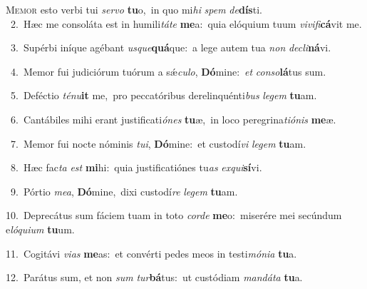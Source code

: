 \lettrine{\initial\textcolor{\initialcolor}{M}}{emor} esto verbi tui \textit{ser}\-\textit{vo} \textbf{tu}\-o,~\star in quo mi\textit{hi} \textit{spem} \textit{de}\-\textbf{dís}ti.\\
{\numbfont\textcolor{\numbcolor}{~2.}}~Hæc me consoláta est in humili\-\textit{tá}\-\textit{te} \textbf{me}\-a:~\star quia elóquium tuum \textit{vi}\-\textit{vi}\textit{fi}\textbf{cá}vit me.\par
{\numbfont\textcolor{\numbcolor}{~3.}}~Supérbi iníque agébant \textit{us}\-\textit{que}\textbf{quá}que:~\star a lege autem tua \textit{non} \textit{de}\-\textit{cli}\textbf{ná}vi.\par
{\numbfont\textcolor{\numbcolor}{~4.}}~Memor fui judiciórum tuórum a sǽ\-\textit{cu}\-\textit{lo}, \textbf{Dó}\-mine:~\star \textit{et} \textit{con}\-\textit{so}\textbf{lá}tus sum.\par
{\numbfont\textcolor{\numbcolor}{~5.}}~Deféctio \textit{té}\-\textit{nu}\textbf{it} me,~\star pro peccatóribus derelinquénti\textit{bus} \textit{le}\-\textit{gem} \textbf{tu}\-am.\par
{\numbfont\textcolor{\numbcolor}{~6.}}~Cantábiles mihi erant justificati\-\textit{ó}\-\textit{nes} \textbf{tu}\-æ,~\star in loco peregrina\-\textit{ti}\-\textit{ó}\textit{nis} \textbf{me}\-æ.\par
{\numbfont\textcolor{\numbcolor}{~7.}}~Memor fui nocte nóminis \textit{tu}\-\textit{i}, \textbf{Dó}\-mine:~\star et custodí\textit{vi} \textit{le}\-\textit{gem} \textbf{tu}\-am.\par
{\numbfont\textcolor{\numbcolor}{~8.}}~Hæc fac\textit{ta} \textit{est} \textbf{mi}\-hi:~\star quia justificatiónes tu\textit{as} \textit{ex}\-\textit{qui}\textbf{sí}vi.\par
{\numbfont\textcolor{\numbcolor}{~9.}}~Pórtio \textit{me}\-\textit{a}, \textbf{Dó}\-mine,~\star dixi custodí\textit{re} \textit{le}\-\textit{gem} \textbf{tu}\-am.\par
{\numbfont\textcolor{\numbcolor}{10.}}~Deprecátus sum fáciem tuam in toto \textit{cor}\-\textit{de} \textbf{me}\-o:~\star miserére mei secúndum e\-\textit{ló}\-\textit{qui}\textit{um} \textbf{tu}\-um.\par
{\numbfont\textcolor{\numbcolor}{11.}}~Cogitávi \textit{vi}\-\textit{as} \textbf{me}\-as:~\star et convérti pedes meos in testi\-\textit{mó}\-\textit{ni}\textit{a} \textbf{tu}\-a.\par
{\numbfont\textcolor{\numbcolor}{12.}}~Parátus sum, et non \textit{sum} \textit{tur}\-\textbf{bá}tus:~\star ut custódiam \textit{man}\-\textit{dá}\textit{ta} \textbf{tu}\-a.\par
